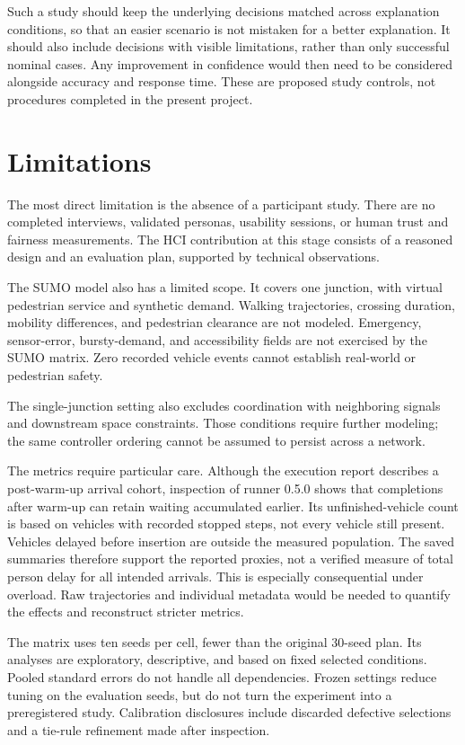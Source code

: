 \documentclass[sigconf]{acmart}
\begin{document}
Such a study should keep the underlying decisions matched across
explanation conditions, so that an easier scenario is not mistaken
for a better explanation. It should also include decisions with
visible limitations, rather than only successful nominal cases.
Any improvement in confidence would then need to be considered
alongside accuracy and response time. These are proposed study
controls, not procedures completed in the present project.

\section{Limitations}
The most direct limitation is the absence of a participant study.
There are no completed interviews, validated personas, usability
sessions, or human trust and fairness measurements. The HCI
contribution at this stage consists of a reasoned design and an
evaluation plan, supported by technical observations.

The SUMO model also has a limited scope. It covers one junction,
with virtual pedestrian service and synthetic demand. Walking
trajectories, crossing duration, mobility differences, and pedestrian
clearance are not modeled. Emergency, sensor-error, bursty-demand,
and accessibility fields are not exercised by the SUMO matrix.
Zero recorded vehicle events cannot establish real-world or
pedestrian safety.

The single-junction setting also excludes coordination with
neighboring signals and downstream space constraints. Those
conditions require further modeling; the same controller ordering
cannot be assumed to persist across a network.

The metrics require particular care. Although the execution report
describes a post-warm-up arrival cohort, inspection of runner 0.5.0
shows that completions after warm-up can retain waiting accumulated
earlier. Its unfinished-vehicle count is based on vehicles with
recorded stopped steps, not every vehicle still present. Vehicles
delayed before insertion are outside the measured population.
The saved summaries therefore support the reported proxies, not
a verified measure of total person delay for all intended arrivals.
This is especially consequential under overload. Raw trajectories
and individual metadata would be needed to quantify the effects
and reconstruct stricter metrics.

The matrix uses ten seeds per cell, fewer than the original
30-seed plan. Its analyses are exploratory, descriptive, and based
on fixed selected conditions. Pooled standard errors do not handle
all dependencies. Frozen settings reduce tuning on the evaluation
seeds, but do not turn the experiment into a preregistered study.
Calibration disclosures include discarded defective selections and
a tie-rule refinement made after inspection.
\end{document}
